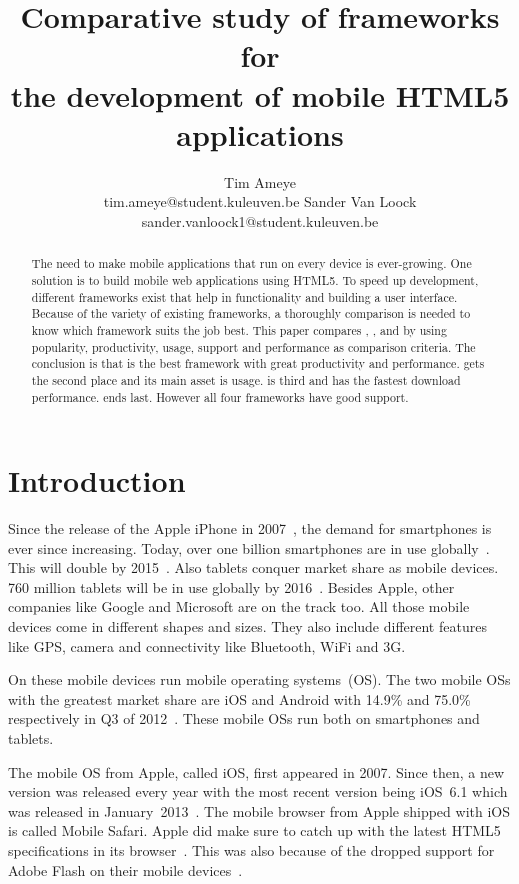 \documentclass[a4paper]{artikel3}
\title{Comparative study of frameworks for \\ the development of mobile HTML5 applications}
\author{Tim Ameye \\ tim.ameye@student.kuleuven.be \And Sander Van Loock \\ sander.vanloock1@student.kuleuven.be}
\begin{document}
\maketitle

\begin{abstract}
The need to make mobile applications that run on every device is ever-growing.
One solution is to build mobile web applications using HTML5.
To speed up development, different frameworks exist that help in functionality and building a user interface.
Because of the variety of existing frameworks, a thoroughly comparison is needed to know which framework suits the job best.
This paper compares \st{}, \jqm{}, \kendo{} and \lungo{} by using popularity, productivity, usage, support and performance as comparison criteria. 
The conclusion is that \jqm{} is the best framework with great productivity and performance. 
\kendo{} gets the second place and its main asset is usage.
\lungo{} is third and has the fastest download performance.
\st{} ends last.
However all four frameworks have good support.
\end{abstract}


\section{Introduction} %
\label{sec:introduction}
Since the release of the Apple iPhone in 2007~\cite{David2011}, the demand for smartphones is ever since increasing. 
Today, over one billion smartphones are in use globally~\cite{Yang2012}.
This will double by 2015~\cite{Gillett2012}.
Also tablets conquer market share as mobile devices.
760 million tablets will be in use globally by 2016~\cite{Gillett2012}.
Besides Apple, other companies like Google and Microsoft are on the track too.
All those mobile devices come in different shapes and sizes.
They also include different features like GPS, camera and connectivity like Bluetooth, WiFi and 3G.

On these mobile devices run mobile operating systems~(OS). The two mobile OSs with the greatest market share are iOS and Android with 14.9\% and 75.0\% respectively in Q3 of 2012~\cite{Protalinski2012}.
These mobile OSs run both on smartphones and tablets.

The mobile OS from Apple, called iOS, first appeared in 2007.
Since then, a new version was released every year with the most recent version being iOS~6.1 which was released in January~2013~\cite{Deitel2012,PhilDutson2012,Apple2013}.
The mobile browser from Apple shipped with iOS is called Mobile Safari.
Apple did make sure to catch up with the latest HTML5 specifications in its browser~\cite{Hales2012}.
This was also because of the dropped support for Adobe Flash on their mobile devices~\cite{Jobs2010}.
\end{document}
